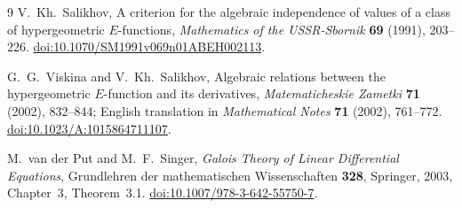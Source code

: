 \documentclass[12pt]{article}
\begin{document}
\begin{thebibliography}{9}
V.~Kh.~Salikhov, A criterion for the algebraic independence of values of a class of hypergeometric $E$-functions, \emph{Mathematics of the USSR-Sbornik} \textbf{69} (1991), 203--226. \href{https://doi.org/10.1070/SM1991v069n01ABEH002113}{doi:10.1070/SM1991v069n01ABEH002113}.

G.~G.~Viskina and V.~Kh.~Salikhov, Algebraic relations between the hypergeometric $E$-function and its derivatives, \emph{Matematicheskie Zametki} \textbf{71} (2002), 832--844; English translation in \emph{Mathematical Notes} \textbf{71} (2002), 761--772. \href{https://doi.org/10.1023/A:1015864711107}{doi:10.1023/A:1015864711107}.

M.~van der Put and M.~F.~Singer, \emph{Galois Theory of Linear Differential Equations}, Grundlehren der mathematischen Wissenschaften \textbf{328}, Springer, 2003, Chapter~3, Theorem~3.1. \href{https://doi.org/10.1007/978-3-642-55750-7}{doi:10.1007/978-3-642-55750-7}.

\end{thebibliography}
\end{document}
